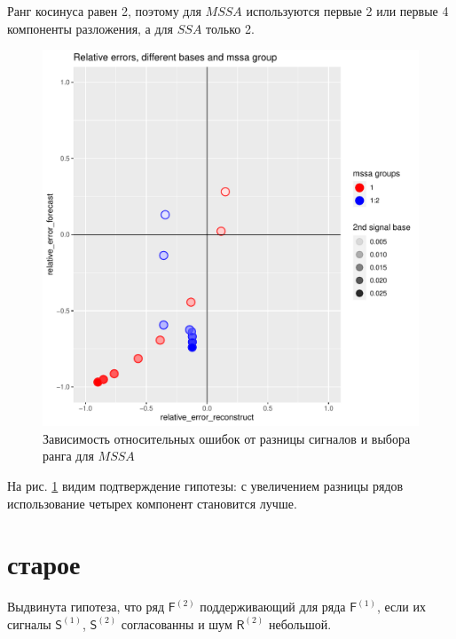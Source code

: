 \documentclass[specialist, substylefile = spbureport.rtx,
    subf,href,colorlinks=true, 12pt]{disser}
\newcommand{\F}{\mathsf{F}}
\newcommand{\sfS}{\mathsf{S}}
\newcommand{\sfR}{\mathsf{R}}
\begin{document}
        Ранг косинуса равен 2, поэтому для $MSSA$ используются первые 2 или первые 4 компоненты разложения, а для $SSA$ только 2.

        \begin{figure}[h]
            \centering
            \includegraphics[width=\textwidth]{experiment_1_exp.pdf}
            \caption{Зависимость относительных ошибок от разницы сигналов и выбора ранга для $MSSA$}
            \label{fig:exp1_exp}
        \end{figure}

        На рис. \ref{fig:exp1_exp} видим подтверждение гипотезы: с увеличением разницы рядов использование четырех компонент становится лучше.

    







        







    \section{старое}
        Выдвинута гипотеза, что ряд $\F^{(2)}$ поддерживающий для ряда $\F^{(1)}$, если их сигналы $\sfS^{(1)}$, $\sfS^{(2)}$ согласованны и шум $\sfR^{(2)}$ небольшой.
\end{document}

